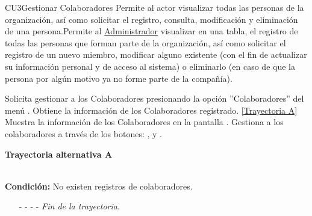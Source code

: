 	\begin{UseCase}{CU3}{Gestionar Colaboradores}{
		Permite al actor visualizar todas las personas de la organización, así como solicitar el registro, consulta, modificación y eliminación de una persona.Permite al {\hyperlink{admin}{Administrador} visualizar en una tabla, el registro de todas las personas que forman parte de la organización, así como solicitar el registro de un nuevo miembro, modificar alguno existente (con el fin de actualizar su información personal y de acceso al sistema) o eliminarlo (en caso de que la persona por algún motivo ya no forme parte de la compañía).\\}
	}
\end{UseCase}
\begin{UCtrayectoria}
	\UCpaso[\UCactor] Solicita gestionar a los Colaboradores presionando la opción ''Colaboradores'' del menú .
	\UCpaso[\UCsist] Obtiene la información de los Colaboradores registrado. \hyperlink{CU3:TAA}{[Trayectoria A]}
	\UCpaso[\UCsist] Muestra la información de los Colaboradores en la pantalla . \label{CU3-P3}
	\UCpaso[\UCactor] Gestiona a los colaboradores a través de los botones: , \editar  y \eliminar.
\end{UCtrayectoria}		
\hypertarget{CU3:TAA}{\textbf{Trayectoria alternativa A}}\\
\noindent \textbf{Condición:} No existen registros de colaboradores.
\begin{enumerate}
	\UCpaso[\UCsist] Muestra el mensaje  en la pantalla  para indicar que no hay registros de colaboradores para mostrar. \label{CU3-A2}
	\UCpaso[\UCactor] Gestiona a los colaboradores a través del botón: . 
	\item[- -] - - {\em {Fin de la trayectoria}}.%
\end{enumerate}

